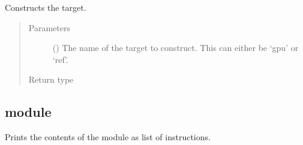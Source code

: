 \documentclass[letterpaper,10pt,english]{sphinxmanual}
\begin{document}

\begin{fulllineitems}
\label{\detokenize{reference/py:migraphx.get_target}}
\sphinxAtStartPar
Constructs the target.
\begin{quote}\begin{description}
\item[{Parameters}] \leavevmode
\sphinxAtStartPar
{} () \textendash{} The name of the target to construct. This can either be ‘gpu’ or ‘ref’.

\item[{Return type}] \leavevmode
\sphinxAtStartPar
{\hyperref[\detokenize{reference/py:migraphx.target}]{}}

\end{description}\end{quote}

\end{fulllineitems}



\subsection{module}
\label{\detokenize{reference/py:module}}

\begin{fulllineitems}
\label{\detokenize{reference/py:migraphx.print}}
\sphinxAtStartPar
Prints the contents of the module as list of instructions.

\end{fulllineitems}

\end{document}
